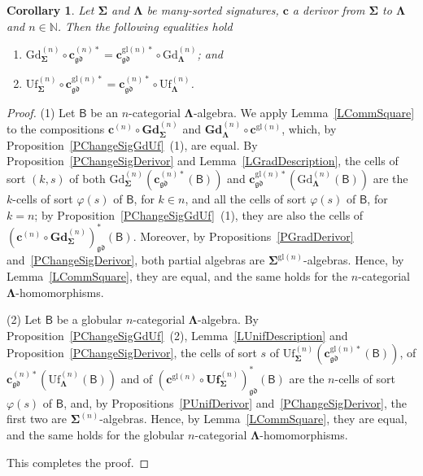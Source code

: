 \documentclass[a4paper, reqno
]{amsart}
\newcommand{\sig}[1]{\mathbf{#1}}             %
\newcommand{\calg}[1]{\boldsymbol{\mathsf{#1}}} %
\newcommand{\gd}{\mathfrak{gd}}              %
\newcommand{\gl}{\mathrm{gl}}                %
\newcommand{\Gd}{\mathrm{Gd}}
\newcommand{\Uf}{\mathrm{Uf}}
\newcommand{\bGd}{\mathbf{Gd}}
\newcommand{\bUf}{\mathbf{Uf}}
\theoremstyle{plain}
\newtheorem{corollary}[theorem]{Corollary}
\theoremstyle{definition}
\begin{document}
\begin{corollary}\label{CChangeSigGdUf}
Let $\sig{\Sigma}$ and $\sig{\Lambda}$ be many-sorted signatures, $\mathbf{c}$ a derivor from $\sig{\Sigma}$ to $\sig{\Lambda}$ and $n\in\mathbb{N}$.
Then the following equalities hold
\begin{enumerate}
	\item
	$\Gd^{(n)}_{\sig{\Sigma}}\circ\mathbf{c}^{(n)\ast}_{\gd}=\mathbf{c}^{\gl(n)\ast}_{\gd}\circ\Gd^{(n)}_{\sig{\Lambda}}$; and

	\item
	$\Uf^{(n)}_{\sig{\Sigma}}\circ\mathbf{c}^{\gl(n)\ast}_{\gd}=\mathbf{c}^{(n)\ast}_{\gd}\circ\Uf^{(n)}_{\sig{\Lambda}}$.
\end{enumerate}
\end{corollary}
\begin{proof}
(1) Let $\calg{B}$ be an $n$-categorial $\sig{\Lambda}$-algebra.
We apply Lemma~\ref{LCommSquare} to the compositions $\mathbf{c}^{(n)}\circ\bGd^{(n)}_{\sig{\Sigma}}$ and $\bGd^{(n)}_{\sig{\Lambda}}\circ\mathbf{c}^{\gl(n)}$, which, by Proposition~\ref{PChangeSigGdUf}~(1), are equal.
By Proposition~\ref{PChangeSigDerivor} and Lemma~\ref{LGradDescription}, the cells of sort $(k,s)$ of both $\Gd^{(n)}_{\sig{\Sigma}}(\mathbf{c}^{(n)\ast}_{\gd}(\calg{B}))$ and $\mathbf{c}^{\gl(n)\ast}_{\gd}(\Gd^{(n)}_{\sig{\Lambda}}(\calg{B}))$ are the $k$-cells of sort $\varphi(s)$ of $\calg{B}$, for $k\in n$, and all the cells of sort $\varphi(s)$ of $\calg{B}$, for $k=n$; by Proposition~\ref{PChangeSigGdUf}~(1), they are also the cells of $(\mathbf{c}^{(n)}\circ\bGd^{(n)}_{\sig{\Sigma}})^{\ast}_{\gd}(\calg{B})$.
Moreover, by Propositions~\ref{PGradDerivor} and~\ref{PChangeSigDerivor}, both partial algebras are $\sig{\Sigma}^{\gl(n)}$-algebras.
Hence, by Lemma~\ref{LCommSquare}, they are equal, and the same holds for the $n$-categorial $\sig{\Lambda}$-homomorphisms.

(2) Let $\calg{B}$ be a globular $n$-categorial $\sig{\Lambda}$-algebra.
By Proposition~\ref{PChangeSigGdUf}~(2), Lemma~\ref{LUnifDescription} and Proposition~\ref{PChangeSigDerivor}, the cells of sort $s$ of $\Uf^{(n)}_{\sig{\Sigma}}(\mathbf{c}^{\gl(n)\ast}_{\gd}(\calg{B}))$, of $\mathbf{c}^{(n)\ast}_{\gd}(\Uf^{(n)}_{\sig{\Lambda}}(\calg{B}))$ and of $(\mathbf{c}^{\gl(n)}\circ\bUf^{(n)}_{\sig{\Sigma}})^{\ast}_{\gd}(\calg{B})$ are the $n$-cells of sort $\varphi(s)$ of $\calg{B}$, and, by Propositions~\ref{PUnifDerivor} and~\ref{PChangeSigDerivor}, the first two are $\sig{\Sigma}^{(n)}$-algebras.
Hence, by Lemma~\ref{LCommSquare}, they are equal, and the same holds for the globular $n$-categorial $\sig{\Lambda}$-homomorphisms.

This completes the proof.
\end{proof}
\end{document}
